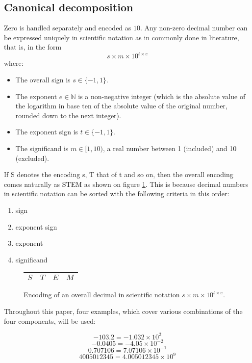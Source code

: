 \documentclass{acm_proc_article-sp}
\begin{document}
\subsection{Canonical decomposition}

Zero is handled separately and encoded as $10$. Any non-zero decimal number can be expressed uniquely in scientific notation as in commonly done in literature, that is, in the form $$s\times m \times10^{t\times e}$$ where:

\begin{itemize}
\item The overall sign is $s\in \{-1, 1\}$.
\item The exponent $e\in \mathbb{N}$ is a non-negative integer (which is the absolute value of the logarithm in base ten of the absolute value of the original number, rounded down to the next integer).
\item The exponent sign is $t\in \{-1, 1\}$.
\item The significand is $m\in [1,10)$, a real number between 1 (included) and 10 (excluded).
\end{itemize}

If S denotes the encoding s, T that of t and so on, then the overall encoding comes naturally as STEM as shown on figure \ref{figure-overall-encoding}. This is because decimal numbers in scientific notation can be sorted with the following criteria in this order:
\begin{enumerate}
\item sign
\item exponent sign
\item exponent
\item significand
\end{enumerate}

\begin{figure}[p]
\caption{Encoding of an overall decimal in scientific notation $s\times m \times10^{t\times e}$.}
\label{figure-overall-encoding}
\center
\begin{tabular}{|l|l|l|l|}
\hline
$S$ & $T$ & $E$ & $M$ \\
\hline
\end{tabular}
\end{figure}

Throughout this paper, four examples, which cover various combinations of the four components, will be used:

$$-103.2 = - 1.032 \times 10^2$$
$$-0.0405 = -4.05 \times 10^{-2}$$
$$0.707106 = 7.07106 \times 10^{-1}$$
$$4005012345 = 4.005012345 \times 10^9$$
\end{document}
